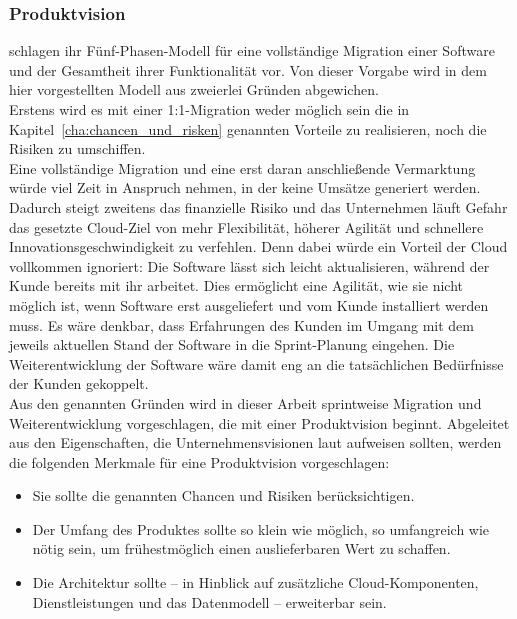 \subsubsection{Produktvision}
 schlagen ihr Fünf-Phasen-Modell für eine vollständige 
Migration einer Software und der Gesamtheit ihrer Funktionalität vor. Von 
dieser Vorgabe wird in dem hier vorgestellten Modell aus zweierlei Gründen 
abgewichen. \\
Erstens wird es mit einer 1:1-Migration weder möglich sein die in 
Kapitel~\ref{cha:chancen_und_risken} genannten Vorteile zu realisieren, noch 
die Risiken zu umschiffen. \\
Eine vollständige Migration und eine erst daran anschließende Vermarktung würde 
viel Zeit in Anspruch nehmen, in der keine Umsätze generiert werden. Dadurch 
steigt zweitens das finanzielle Risiko und das Unternehmen läuft Gefahr das 
gesetzte Cloud-Ziel von mehr Flexibilität, höherer Agilität und schnellere 
Innovationsgeschwindigkeit zu verfehlen. Denn dabei würde ein Vorteil der 
Cloud vollkommen ignoriert: Die Software lässt sich leicht aktualisieren, 
während der Kunde bereits mit ihr arbeitet. Dies ermöglicht eine Agilität, wie 
sie nicht möglich ist, wenn Software erst ausgeliefert und vom Kunde installiert 
werden muss. Es wäre denkbar, dass Erfahrungen des Kunden im Umgang mit dem 
jeweils aktuellen Stand der Software in die Sprint-Planung eingehen. Die 
Weiterentwicklung der Software wäre damit eng an die tatsächlichen Bedürfnisse 
der Kunden gekoppelt. \\

Aus den genannten Gründen wird in dieser Arbeit sprintweise Migration und 
Weiterentwicklung vorgeschlagen, die mit einer Produktvision beginnt. 
Abgeleitet aus den Eigenschaften, die Unternehmensvisionen laut 
 aufweisen sollten, werden die folgenden Merkmale 
für eine Produktvision vorgeschlagen:
\begin{itemize}
	\item Sie sollte die genannten Chancen und Risiken berücksichtigen.
	\item Der Umfang des Produktes sollte so klein wie möglich, so 
umfangreich wie nötig sein, um frühestmöglich einen auslieferbaren Wert zu 
schaffen. 
	\item Die Architektur sollte -- in Hinblick auf zusätzliche 
Cloud-Komponenten, Dienstleistungen und das Datenmodell -- erweiterbar sein.
\end{itemize} 


